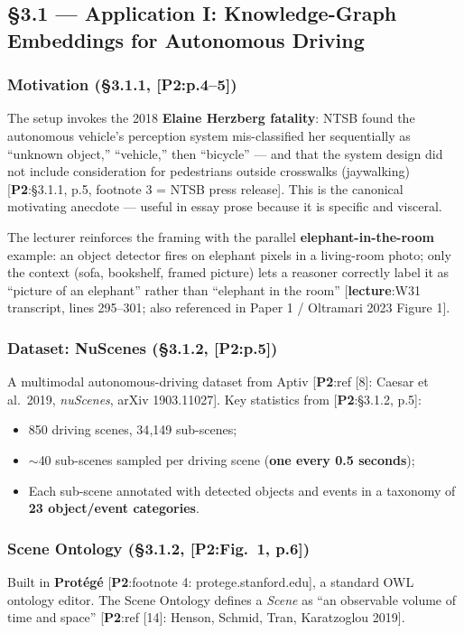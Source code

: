 \documentclass[11pt, a4paper]{article}
\newcommand{\paperref}[1]{\textcolor{srcBd}{\small[\textbf{P2}:#1]}}
\newcommand{\lectref}[1]{\textcolor{srcBd}{\small[\textbf{lecture}:#1]}}
\begin{document}
\subsection{§3.1 — Application I: Knowledge-Graph Embeddings for Autonomous Driving}

\subsubsection*{Motivation (§3.1.1, \paperref{p.4--5})}
The setup invokes the 2018 \textbf{Elaine Herzberg fatality}: NTSB found the autonomous vehicle's perception system mis-classified her sequentially as ``unknown object,'' ``vehicle,'' then ``bicycle'' — and that the system design did not include consideration for pedestrians outside crosswalks (jaywalking) \paperref{§3.1.1, p.5, footnote 3 = NTSB press release}. This is the canonical motivating anecdote — useful in essay prose because it is specific and visceral.

The lecturer reinforces the framing with the parallel \textbf{elephant-in-the-room} example: an object detector fires on elephant pixels in a living-room photo; only the context (sofa, bookshelf, framed picture) lets a reasoner correctly label it as ``picture of an elephant'' rather than ``elephant in the room'' \lectref{W31 transcript, lines 295--301; also referenced in Paper 1 / Oltramari 2023 Figure 1}.

\subsubsection*{Dataset: NuScenes (§3.1.2, \paperref{p.5})}
A multimodal autonomous-driving dataset from Aptiv \paperref{ref [8]: Caesar et al.\ 2019, \emph{nuScenes}, arXiv 1903.11027}. Key statistics from \paperref{§3.1.2, p.5}:
\begin{itemize}
  \item 850 driving scenes, 34{,}149 sub-scenes;
  \item \(\sim\)40 sub-scenes sampled per driving scene (\textbf{one every 0.5 seconds});
  \item Each sub-scene annotated with detected objects and events in a taxonomy of \textbf{23 object/event categories}.
\end{itemize}

\subsubsection*{Scene Ontology (§3.1.2, \paperref{Fig.\ 1, p.6})}
Built in \textbf{Protégé} \paperref{footnote 4: protege.stanford.edu}, a standard OWL ontology editor. The Scene Ontology defines a \emph{Scene} as ``an observable volume of time and space'' \paperref{ref [14]: Henson, Schmid, Tran, Karatzoglou 2019}.
\end{document}
